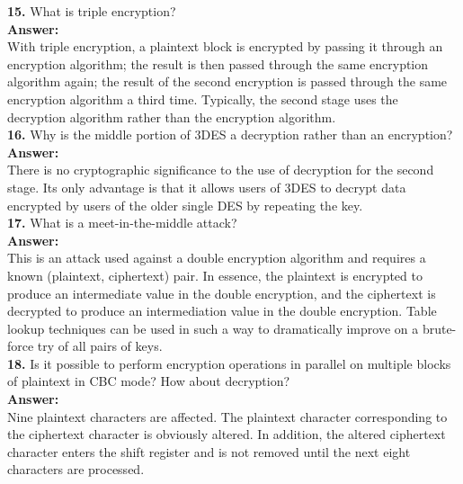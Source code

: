 \documentclass[paper=a4, fontsize=11pt]{scrartcl} %
\numberwithin{equation}{section} %
\numberwithin{figure}{section} %
\numberwithin{table}{section} %
\begin{document}
\textbf{15.} What is triple encryption?\\

\textbf{Answer:}\\

With triple encryption, a plaintext block is encrypted by passing it through an encryption algorithm; the result is then passed through the same encryption algorithm again; the result of the second encryption is passed through the same encryption algorithm a third time. Typically, the second stage uses the decryption algorithm rather than the encryption algorithm.\\


\textbf{16.} Why is the middle portion of 3DES a decryption rather than an encryption?\\

\textbf{Answer:}\\

There is no cryptographic significance to the use of decryption for the second stage. Its only advantage is that it allows users of 3DES to decrypt data encrypted by users of the older single DES by repeating the key.\\

\textbf{17.} What is a meet-in-the-middle attack?\\

\textbf{Answer:}\\

This is an attack used against a double encryption algorithm and requires a known (plaintext, ciphertext) pair. In essence, the plaintext is encrypted to produce an intermediate value in the double encryption, and the ciphertext is decrypted to produce an intermediation value in the double encryption. Table lookup techniques can be used in such a way to dramatically improve on a brute-force try of all pairs of keys.\\

\textbf{18.} Is it possible to perform encryption operations in parallel on multiple blocks of plaintext in CBC mode? How about decryption?\\

\textbf{Answer:}\\

Nine plaintext characters are affected.  The plaintext character corresponding to the ciphertext character is obviously altered. In addition, the altered ciphertext character enters the shift register and is not removed until the next eight characters are processed.\\
\end{document}
